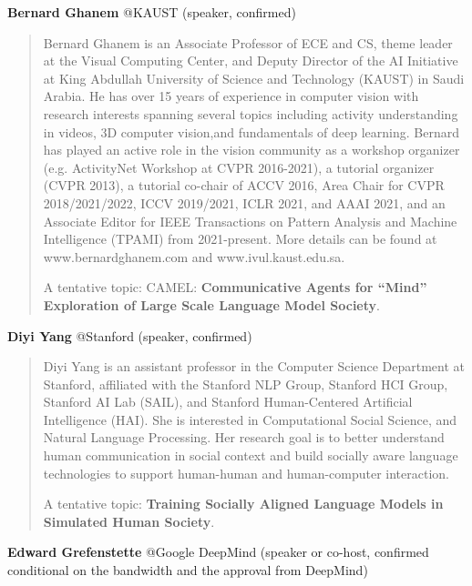 \documentclass[10pt]{article} %
\begin{document}
{\bf Bernard Ghanem} @KAUST (speaker, confirmed)  

\begin{quote}
    Bernard Ghanem is an Associate Professor of ECE and CS, theme leader at the Visual Computing Center, and Deputy Director of the AI Initiative at King Abdullah University of Science and Technology (KAUST) in Saudi Arabia. He has over 15 years of experience in computer vision with research interests spanning several topics including activity understanding in videos, 3D computer vision,and fundamentals of deep learning. Bernard has played an active role in the vision community as a workshop organizer (e.g. ActivityNet Workshop at CVPR 2016-2021), a tutorial organizer (CVPR 2013), a tutorial co-chair of ACCV 2016, Area Chair for CVPR 2018/2021/2022, ICCV 2019/2021, ICLR 2021, and AAAI 2021, and an Associate Editor for IEEE Transactions on Pattern Analysis and Machine Intelligence (TPAMI) from 2021-present. More details can be found at www.bernardghanem.com and www.ivul.kaust.edu.sa.  

    A tentative topic: CAMEL: {\bf Communicative Agents for ``Mind'' Exploration of Large Scale Language Model Society}.
\end{quote}



{\bf Diyi Yang} @Stanford (speaker, confirmed)  
\begin{quote}
Diyi Yang is an assistant professor in the Computer Science Department at Stanford, affiliated with the Stanford NLP Group, Stanford HCI Group, Stanford AI Lab (SAIL), and Stanford Human-Centered Artificial Intelligence (HAI). She is interested in Computational Social Science, and Natural Language Processing. Her research goal is to better understand human communication in social context and build socially aware language technologies to support human-human and human-computer interaction.  

A tentative topic: {\bf Training Socially Aligned Language Models in Simulated Human Society}.
\end{quote}


{\bf Edward Grefenstette} @Google DeepMind (speaker or co-host, confirmed conditional on the bandwidth and the approval from DeepMind)  
\end{document}
